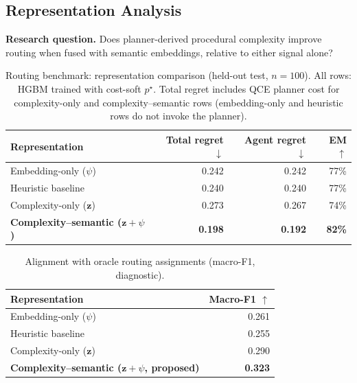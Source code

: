\subsection{Representation Analysis}
\label{sec:representation-analysis}
\label{sec:feature-ablation}
\label{sec:main-results}

\textbf{Research question.}
Does planner-derived procedural complexity improve routing when fused with semantic
embeddings, relative to either signal alone?

\begin{table}[t]
  \centering
  \footnotesize
  \setlength{\tabcolsep}{2pt}
  \caption{Routing benchmark: representation comparison (held-out test, $n{=}100$).
    All rows: HGBM trained with cost-soft $p^\star$.
    Total regret includes QCE planner cost for complexity-only and complexity--semantic rows
    (embedding-only and heuristic rows do not invoke the planner).}
  \label{tab:feature-regret}
  \begin{tabular}{@{}lrrr@{}}
    \toprule
    Representation & Total regret $\downarrow$ & Agent regret $\downarrow$ & EM $\uparrow$ \\
    \midrule
    Embedding-only ($\psi$) & 0.242 & 0.242 & 77\% \\
    Heuristic baseline & 0.240 & 0.240 & 77\% \\
    Complexity-only ($\mathbf{z}$) & 0.273 & 0.267 & 74\% \\
    \textbf{Complexity--semantic ($\mathbf{z}+\psi$)} & \textbf{0.198} & \textbf{0.192} & \textbf{82\%} \\
    \bottomrule
  \end{tabular}
\end{table}

\begin{table}[t]
  \centering
  \footnotesize
  \caption{Alignment with oracle routing assignments (macro-F1, diagnostic).}
  \label{tab:feature-macro-f1}
  \begin{tabular}{@{}lr@{}}
    \toprule
    Representation & Macro-F1 $\uparrow$ \\
    \midrule
    Embedding-only ($\psi$) & 0.261 \\
    Heuristic baseline & 0.255 \\
    Complexity-only ($\mathbf{z}$) & 0.290 \\
    \textbf{Complexity--semantic ($\mathbf{z}+\psi$, proposed)} & \textbf{0.323} \\
    \bottomrule
  \end{tabular}
\end{table}

